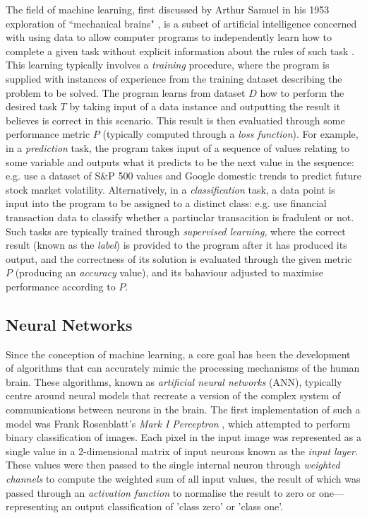 \documentclass[a4paper, 11pt]{report}
\begin{document}
    The field of machine learning, first discussed by Arthur Samuel in his 1953 exploration of ``mechanical brains" \citep{samuel-1959}, is a subset of artificial intelligence concerned with using data to allow computer programs to independently learn how to complete a given task without explicit information about the rules of such task \citep{samuel-1959}. This learning typically involves a \emph{training} procedure, where the program is supplied with instances of experience from the training dataset describing the problem to be solved. The program learns from dataset $D$ how to perform the desired task $T$ by taking input of a data instance and outputting the result it believes is correct in this scenario. This result is then evaluatied through some performance metric $P$ (typically computed through a \emph{loss function}). For example, in a \emph{prediction} task, the program takes input of a sequence of values relating to some variable and outputs what it predicts to be the next value in the sequence: e.g. \citet{xiong-2015} use a dataset of S\&P 500 values and Google domestic trends to predict future stock market volatility. Alternatively, in a \emph{classification} task, a data point is input into the program to be assigned to a distinct class: e.g. \citet{sadgali-2019} use financial transaction data to classify whether a partiuclar transacition is fradulent or not. Such tasks are typically trained through \emph{supervised learning}, where the correct result (known as the \emph{label}) is provided to the program after it has produced its output, and the correctness of its solution is evaluated through the given metric $P$ (producing an \emph{accuracy} value), and its bahaviour adjusted to maximise performance according to $P$.


    \subsection{Neural Networks}

    Since the conception of machine learning, a core goal has been the development of algorithms that can accurately mimic the processing mechanisms of the human brain. These algorithms, known as \emph{artificial neural networks} (ANN), typically centre around neural models that recreate a version of the complex system of communications between neurons in the brain. The first implementation of such a model was Frank Rosenblatt's \emph{Mark I Perceptron} \citep{rosenblatt-1958}, which attempted to perform binary classification of images. Each pixel in the input image was represented as a single value in a 2-dimensional matrix of input neurons known as the \emph{input layer}. These values were then passed to the single internal neuron through \emph{weighted channels} to compute the weighted sum of all input values,  the result of which was passed through an \emph{activation function} to normalise the result to zero or one—representing an output classification of 'class zero' or 'class one'. 
\end{document}
